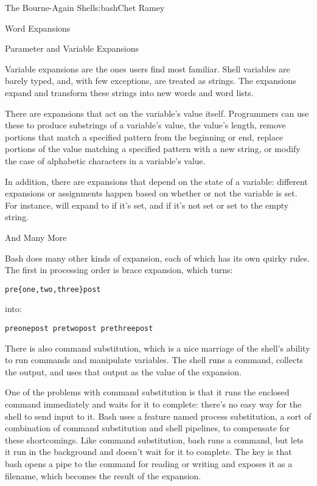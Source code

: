 \begin{aosachapter}{The Bourne-Again Shell}{s:bash}{Chet Ramey}
\begin{aosasect1}{Word Expansions}
\begin{aosasect2}{Parameter and Variable Expansions}

Variable expansions are the ones users find most familiar.  Shell
variables are barely typed, and, with few exceptions, are treated as
strings.  The expansions expand and transform these strings into new
words and word lists.

There are expansions that act on the variable's value itself.
Programmers can use these to produce substrings of a variable's
value, the value's length, remove portions that match a specified
pattern from the beginning or end, replace portions of the value
matching a specified pattern with a new string, or modify the case of
alphabetic characters in a variable's value.

In addition, there are expansions that depend on the state of a
variable: different expansions or assignments happen based on whether
or not the variable is set.  For instance,
 will expand to  if it's
set, and  if it's not set or set to the empty string.

\end{aosasect2}

\begin{aosasect2}{And Many More}

Bash does many other kinds of expansion, each of which has its own
quirky rules.  The first in processing order is brace expansion, which
turns:

\begin{verbatim}
pre{one,two,three}post
\end{verbatim}

\noindent into:

\begin{verbatim}
preonepost pretwopost prethreepost
\end{verbatim}

There is also command substitution, which is a nice marriage of the
shell's ability to run commands and manipulate variables.  The shell
runs a command, collects the output, and uses that output as the value
of the expansion.

One of the problems with command substitution is that it runs the
enclosed command immediately and waits for it to complete: there's
no easy way for the shell to send input to it.  Bash uses a feature
named process substitution, a sort of combination of command
substitution and shell pipelines, to compensate for these
shortcomings.  Like command substitution, bash runs a command, but
lets it run in the background and doesn't wait for it to complete.
The key is that bash opens a pipe to the command for reading or
writing and exposes it as a filename, which becomes the result of the
expansion.


\end{aosasect2}
\end{aosasect1}
\end{aosachapter}
